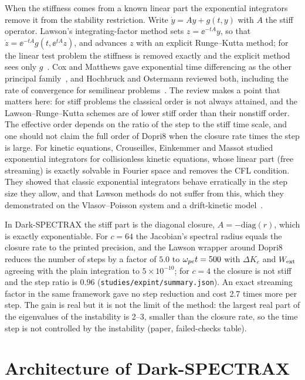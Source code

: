 When the stiffness comes from a known linear part the exponential integrators remove it from the stability restriction. Write $\dot y=Ay+g(t,y)$ with $A$ the stiff operator. Lawson's integrating-factor method sets $z=\ee^{-tA}y$, so that $\dot z=\ee^{-tA}g(t,\ee^{tA}z)$, and advances $z$ with an explicit Runge--Kutta method; for the linear test problem the stiffness is removed exactly and the explicit method sees only $g$~\citep{Lawson1967}. Cox and Matthews gave exponential time differencing as the other principal family~\citep{CoxMatthews2002}, and Hochbruck and Ostermann reviewed both, including the rate of convergence for semilinear problems~\citep{Hochbruck2010}. The review makes a point that matters here: for stiff problems the classical order is not always attained, and the Lawson--Runge--Kutta schemes are of lower stiff order than their nonstiff order. The effective order depends on the ratio of the step to the stiff time scale, and one should not claim the full order of Dopri8 when the closure rate times the step is large. For kinetic equations, Crouseilles, Einkemmer and Massot studied exponential integrators for collisionless kinetic equations, whose linear part (free streaming) is exactly solvable in Fourier space and removes the CFL condition. They showed that classic exponential integrators behave erratically in the step size they allow, and that Lawson methods do not suffer from this, which they demonstrated on the Vlasov--Poisson system and a drift-kinetic model~\citep{Crouseilles2020}.

In Dark-SPECTRAX the stiff part is the diagonal closure, $A=-\mathrm{diag}(r)$, which is exactly exponentiable. For $c=64$ the Jacobian's spectral radius equals the closure rate to the printed precision, and the Lawson wrapper around Dopri8 reduces the number of steps by a factor of $5.0$ to $\omega_{pe} t=500$ with $\Delta K_e$ and $W_{\rm ext}$ agreeing with the plain integration to $5\times10^{-10}$; for $c=4$ the closure is not stiff and the step ratio is $0.96$ (\texttt{studies/expint/summary.json}). An exact streaming factor in the same framework gave no step reduction and cost 2.7 times more per step. The gain is real but it is not the limit of the method: the largest real part of the eigenvalues of the instability is 2--3, smaller than the closure rate, so the time step is not controlled by the instability (paper, failed-checks table).

\section{Architecture of Dark-SPECTRAX}\label{sec:architecture}

